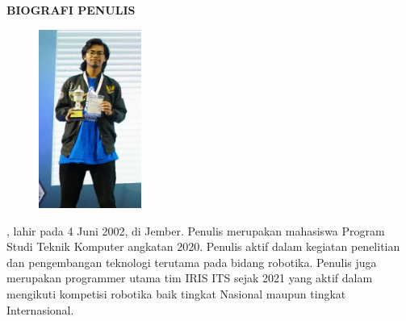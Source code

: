 \begin{center}
  \Large
  \textbf{BIOGRAFI PENULIS}
\end{center}


\vspace{2ex}

\begin{figure}
  \centering
  \vspace{-3ex}
  \includegraphics[width=0.3\textwidth]{gambar/foto_piala_asli_cropped.jpg}
  \vspace{-4ex}
\end{figure}

\name{}, lahir pada 4 Juni 2002, di Jember. Penulis merupakan mahasiswa Program Studi Teknik Komputer angkatan 2020. Penulis aktif dalam kegiatan penelitian dan pengembangan teknologi terutama pada bidang robotika. Penulis juga merupakan programmer utama tim IRIS ITS sejak 2021 yang aktif dalam mengikuti kompetisi robotika baik tingkat Nasional maupun tingkat Internasional.